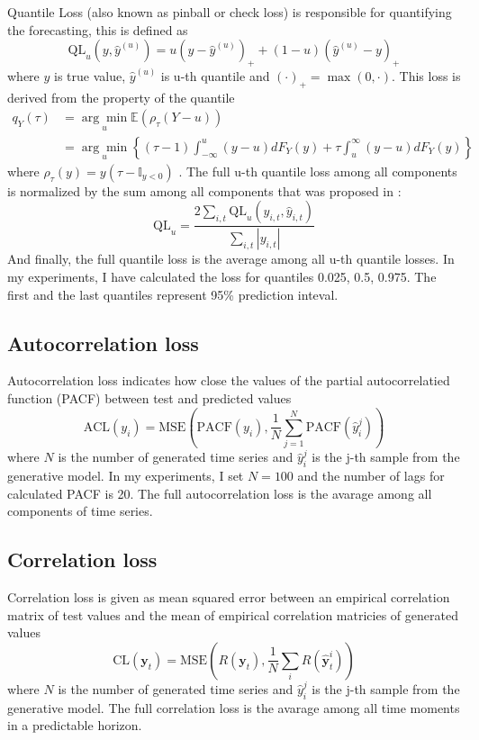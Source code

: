 \documentclass[12pt,a4paper]{article}
\begin{document}
Quantile Loss (also known as pinball or check loss) is responsible for quantifying the forecasting, this is defined as 
$$\text{QL}_{u}\left(y, \hat{y}^{(u)}\right)=u\left(y-\hat{y}^{(u)}\right)_{+}+(1-u)\left(\hat{y}^{(u)}-y\right)_{+}$$
where $y$ is true value, $\hat y^{(u)}$ is u-th quantile and $(\cdot)_+ = \max(0, \cdot)$.
This loss is derived from the property of the quantile
$$
\begin{aligned}
q_{Y}(\tau) &=\underset{u}{\arg \min } \mathbb E\left(\rho_{\tau}(Y-u)\right)\\
&=\underset{u}{\arg \min }\left\{(\tau-1) \int_{-\infty}^{u}(y-u) d F_{Y}(y)+\tau \int_{u}^{\infty}(y-u) d F_{Y}(y)\right\}    
\end{aligned}$$
where $\rho_{\tau}(y) = y(\tau - \mathbb I_{y<0})$ \cite{Koenker2005}. The full u-th quantile loss among all components is normalized by the sum among all components that was proposed in \cite{gaussiantcn2020}:
$$\text{QL}_u = \frac{2 \sum_{i,t} \text{QL}_u(y_{i,t}, \hat y_{i,t})}{\sum_{i,t} |y_{i, t}|}$$
And finally, the full quantile loss is the average among all u-th quantile losses. In my experiments, I have calculated the loss for quantiles 0.025, 0.5, 0.975. The first and the last quantiles represent 95\% prediction inteval.

\subsection{Autocorrelation loss}

Autocorrelation loss indicates how close the values of the partial autocorrelatied function (PACF) between test and predicted values
$$\text{ACL} (y_{i}) = \text{MSE}
\left(\text{PACF}(y_i), \frac{1}{N} \sum_{j=1}^N \text{PACF}(\hat y_i^j) \right)
$$
where $N$ is the number of generated time series and $\hat y_{i}^j$ is the j-th sample from the generative model. In my experiments, I set $N=100$ and the number of lags for calculated PACF is 20. The full autocorrelation loss is the avarage among all components of time series.

\subsection{Correlation loss}

Correlation loss is given as mean squared error between an empirical correlation matrix of test values and the mean of empirical correlation matricies of generated values
$$\text{CL}(\mathbf y_t) = \text{MSE} \left( R (\mathbf y_t), \frac{1}{N} \sum_i  R(\hat{\mathbf y}^i_t) \right)$$
where $N$ is the number of generated time series and $\hat y_{i}^j$ is the j-th sample from the generative model. The full correlation loss is the avarage among all time moments in a predictable horizon.
\end{document}

